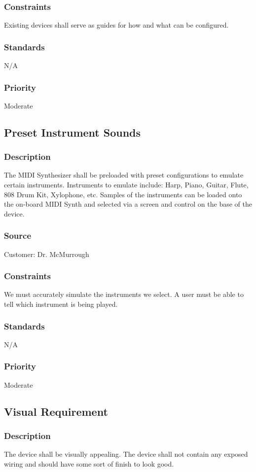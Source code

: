 \subsubsection{Constraints}
Existing devices shall serve as guides for how and what can be configured. 
\subsubsection{Standards}
N/A
\subsubsection{Priority}
Moderate

\subsection{Preset Instrument Sounds}
\subsubsection{Description}
The MIDI Synthesizer shall be preloaded with preset configurations to emulate certain instruments. Instruments to emulate include: Harp, Piano, Guitar, Flute, 808 Drum Kit, Xylophone, etc. Samples of the instruments can be loaded onto the on-board MIDI Synth and selected via a screen and control on the base of the device.
\subsubsection{Source}
Customer: Dr. McMurrough
\subsubsection{Constraints}
We must accurately simulate the instruments we select. A user must be able to tell which instrument is being played.
\subsubsection{Standards}
N/A
\subsubsection{Priority}
Moderate

\subsection{Visual Requirement}
\subsubsection{Description}
The device shall be visually appealing. The device shall not contain any exposed wiring and should have some sort of finish to look good. 
